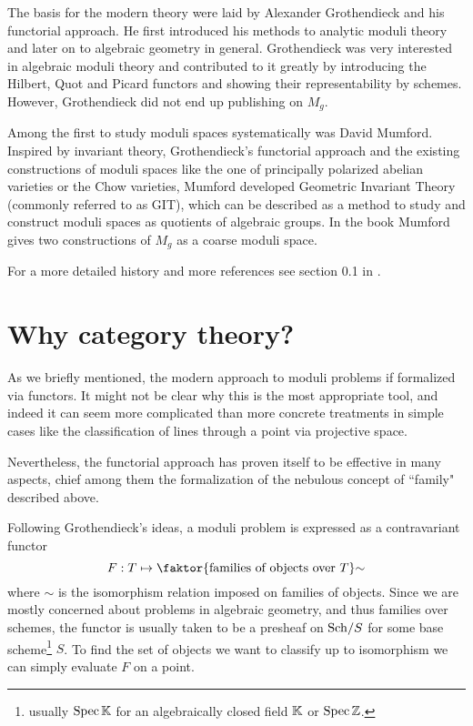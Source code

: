 The basis for the modern theory were laid by Alexander Grothendieck and his functorial approach.
He first introduced his methods to analytic moduli theory and later on to algebraic geometry in general.
Grothendieck was very interested in algebraic moduli theory and contributed to it greatly by introducing the Hilbert, Quot and Picard functors and showing their representability by schemes. However, Grothendieck did not end up publishing on $M_g$.

Among the first to study moduli spaces systematically was David Mumford.
Inspired by invariant theory, Grothendieck's functorial approach and the existing constructions of moduli spaces like the one of principally polarized abelian varieties or the Chow varieties, Mumford developed Geometric Invariant Theory (commonly referred to as GIT), which can be described as a method to study and construct moduli spaces as quotients of algebraic groups.
In the book \cite{GIT} Mumford gives two constructions of $M_g$ as a coarse moduli space.

For a more detailed history and more references see section 0.1 in \cite{Alper}.

\section*{Why category theory?}
As we briefly mentioned, the modern approach to moduli problems if formalized via functors. It might not be clear why this is the most appropriate tool, and indeed it can seem more complicated than more concrete treatments in simple cases like the classification of lines through a point via projective space.

Nevertheless, the functorial approach has proven itself to be effective in many aspects, chief among them the formalization of the nebulous concept of ``family" described above.\medskip

Following Grothendieck's ideas, a moduli problem is expressed as a contravariant functor
\[F:T\mapsto \quot{\cpa{\text{families of objects over $T$}}}\sim\]
where $\sim$ is the isomorphism relation imposed on families of objects.
Since we are mostly concerned about problems in algebraic geometry, and thus families over schemes, the functor is usually taken to be a presheaf on ${\mathrm{Sch}}/{S}$ for some base scheme\footnote{usually $\mathrm{Spec}\, \mathbb{K}$ for an algebraically closed field $\mathbb{K}$ or $\mathrm{Spec}\, \mathbb{Z}$.} $S$.
To find the set of objects we want to classify up to isomorphism we can simply evaluate $F$ on a point.

